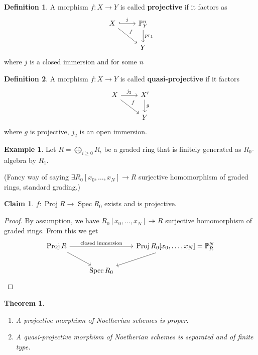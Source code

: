 \documentclass[12pt]{article}
\DeclareMathOperator{\Spec}{Spec}
\DeclareMathOperator{\Proj}{Proj}
\newtheorem*{theorem}{Theorem}
\theoremstyle{definition}
\newtheorem*{definition}{Definition}
\newtheorem*{claim}{Claim}
\newtheorem*{example}{Example}
\begin{document}
\begin{definition}
A morphism $f:X\rightarrow Y$ is called \textbf{projective} if it factors as
\[\begin{tikzcd}X\arrow[r,hook,"j"]\arrow[rd,"f"]&\mathbb P_Y^n\arrow[d,"pr_1"]\\&Y\end{tikzcd}\]
where $j$ is a closed immersion and for some $n$
\end{definition}

\begin{definition}
A morphism $f:X\rightarrow Y$ is called \textbf{quasi-projective} if it factors
\[\begin{tikzcd}X\arrow[r,"j_2"]\arrow[rd,"f"]&X'\arrow[d,"g"]\\&Y\end{tikzcd}\]
where $g$ is projective, $j_2$ is an open immersion.
\end{definition}

\begin{example}
Let $R=\bigoplus_{i\geq0}R_i$ be a graded ring that is finitely generated as $R_0$-algebra by $R_1$.

(Fancy way of saying $\exists R_0[x_0,\ldots,x_N]\rightarrow R$ surjective homomorphism of graded rings, standard grading.)

\begin{claim}
$f:\Proj R\rightarrow\Spec R_0$ exists and is projective.
\end{claim}

\begin{proof}
By assumption, we have $R_0[x_0,\ldots,x_N]\twoheadrightarrow R$ surjective homomorphism of graded rings. From this we get
\[\begin{tikzcd}\Proj R\arrow[rr,"\text{closed immersion}"]\arrow[rd]&&\Proj R_0[x_0,\ldots,x_N]=\mathbb P_R^N\arrow[ld]\\&\Spec R_0\end{tikzcd}\]
\end{proof}
\end{example}

\begin{theorem}
\begin{enumerate}[label=\arabic*)]
\item A projective morphism of Noetherian schemes is proper.

\item A quasi-projective morphism of Noetherian schemes is separated and of finite type.
\end{enumerate}
\end{theorem}
\end{document}
